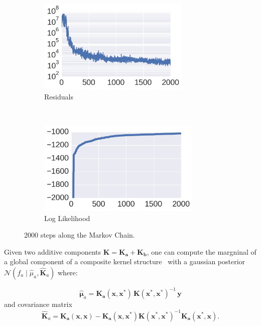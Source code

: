 \documentclass{article} %
\newcommand{\xbf}{\mathbf{x}}
\newcommand{\ybf}{\mathbf{y}}
\begin{document}
\begin{figure}
        \centering
        \begin{subfigure}[b]{0.5\textwidth} \centering
                \includegraphics[height=4.5cm]{figs/structureAirline_res_c.png}
                \caption{Residuals}
                \label{fig:res}
        \end{subfigure}%
        ~ %
        \begin{subfigure}[b]{0.5\textwidth} \centering
                \includegraphics[height=4.5cm]{figs/structureAirline_log_c.png}
                \caption{Log Likelihood}
                \label{fig:log))}
        \end{subfigure}
        \caption{2000 steps along the Markov Chain.}\label{fig:reslog}
\end{figure}

Given two additive components $\mathbf{K} = \mathbf{K_a} + \mathbf{K_b}$, one can compute the margninal of a global component of a composite kernel structure~\citep{benavoli2015gaussian} with a gaussian posterior $\mathcal{N}(f_a \mid \hat{\mu}_a,\hat{\mathbf{K}}_a)$  where:

\begin{equation}
\label{eq:marginalComponentMean}
\hat{\bm\mu}_a   = \mathbf{K_a}(\xbf,\xbf^*)\, \mathbf{K}(\xbf^*,\xbf^*)^{-1}\, \ybf
\end{equation}
and covariance matrix
\begin{equation}
\label{eq:marginalComponentCovariance}
\hat{\mathbf{K}}_a =   \mathbf{K_a}(\xbf,\xbf) -  \mathbf{K_a}(\xbf,\xbf^*)\mathbf{K}(\xbf^*,\xbf^*)^{-1} \mathbf{K_a}(\xbf^*,\xbf).
\end{equation}
\end{document}
